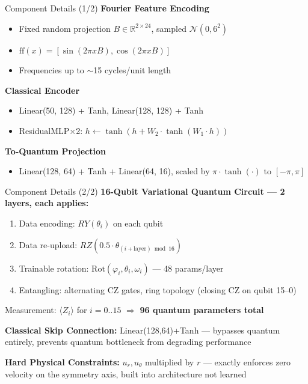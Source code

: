 \documentclass[aspectratio=169]{beamer}
\begin{document}
\begin{frame}{Component Details (1/2)}
\textbf{Fourier Feature Encoding}
\begin{itemize}
  \item Fixed random projection $B \in \mathbb{R}^{2\times24}$, sampled $\mathcal{N}(0, 6^2)$
  \item $\text{ff}(x) = [\sin(2\pi x B), \cos(2\pi x B)]$
  \item Frequencies up to $\sim$15 cycles/unit length
\end{itemize}

\vspace{0.2cm}
\textbf{Classical Encoder}
\begin{itemize}
  \item Linear(50, 128) + Tanh, Linear(128, 128) + Tanh
  \item ResidualMLP$\times$2: $h \leftarrow \tanh(h + W_2 \cdot \tanh(W_1 \cdot h))$
\end{itemize}

\vspace{0.2cm}
\textbf{To-Quantum Projection}
\begin{itemize}
  \item Linear(128, 64) + Tanh + Linear(64, 16), scaled by $\pi\cdot\tanh(\cdot)$ to $[-\pi, \pi]$
\end{itemize}
\end{frame}

\begin{frame}{Component Details (2/2)}
\textbf{16-Qubit Variational Quantum Circuit --- 2 layers, each applies:}
\begin{enumerate}
  \item Data encoding: $RY(\theta_i)$ on each qubit
  \item Data re-upload: $RZ(0.5\cdot\theta_{(i+\text{layer}) \bmod 16})$
  \item Trainable rotation: $\text{Rot}(\varphi_i, \theta_i, \omega_i)$ --- 48 params/layer
  \item Entangling: alternating CZ gates, ring topology (closing CZ on qubit 15--0)
\end{enumerate}
Measurement: $\langle Z_i \rangle$ for $i = 0..15$ \quad $\Rightarrow$ \textbf{96 quantum parameters total}

\vspace{0.3cm}
\textbf{Classical Skip Connection:} Linear(128,64)+Tanh --- bypasses quantum entirely, prevents quantum bottleneck from degrading performance

\vspace{0.3cm}
\textbf{Hard Physical Constraints:} $u_r, u_\theta$ multiplied by $r$ --- exactly enforces zero velocity on the symmetry axis, built into architecture not learned
\end{frame}
\end{document}
